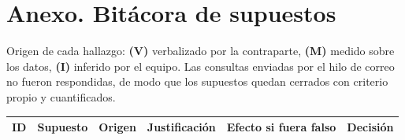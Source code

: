 
\section*{Anexo. Bitácora de supuestos}

Origen de cada hallazgo: \textbf{(V)} verbalizado por la contraparte, \textbf{(M)} medido sobre los datos, \textbf{(I)} inferido por el equipo. Las consultas enviadas por el hilo de correo no fueron respondidas, de modo que los supuestos quedan cerrados con criterio propio y cuantificados.

\begin{longtable}{p{0.6cm} p{3.0cm} c p{4.3cm} p{4.3cm} p{2.0cm}}
\toprule
\textbf{ID} & \textbf{Supuesto} & \textbf{Origen} & \textbf{Justificación} & \textbf{Efecto si fuera falso} & \textbf{Decisión} \\
\midrule
\endhead


\end{longtable}
